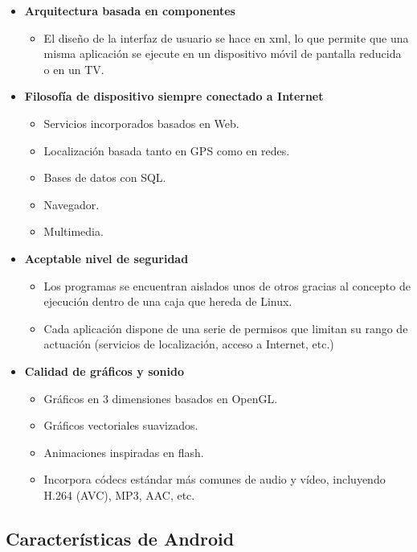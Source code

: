 \begin{itemize}
	\item \textbf{Arquitectura basada en componentes}
	\begin{itemize}
		\item El diseño de la interfaz de usuario se hace en xml, lo que permite que una misma aplicación se ejecute en un dispositivo móvil de pantalla reducida o en un TV.
	\end{itemize}
	\item \textbf{Filosofía de dispositivo siempre conectado a Internet}
	\begin{itemize}
		\item Servicios incorporados basados en Web.
		\item Localización basada tanto en GPS como en redes. 
		\item Bases de datos con SQL. 
		\item Navegador. 
		\item Multimedia.
	\end{itemize}
	\item \textbf{Aceptable nivel de seguridad}
	\begin{itemize}
		\item Los programas se encuentran aislados unos de otros gracias al concepto de ejecución dentro de una caja que hereda de Linux.
		\item Cada aplicación dispone de una serie de permisos que limitan su rango de actuación (servicios de localización, acceso a Internet, etc.)
	\end{itemize}
	\item \textbf{Calidad de gráficos y sonido}
	\begin{itemize}
		\item Gráficos en 3 dimensiones basados en OpenGL.
		\item Gráficos vectoriales suavizados.
		\item Animaciones inspiradas en flash.
		\item Incorpora códecs estándar más comunes de audio y vídeo, incluyendo H.264 (AVC), MP3, AAC, etc.
	\end{itemize}
\end{itemize}

\subsection{Características de Android}

